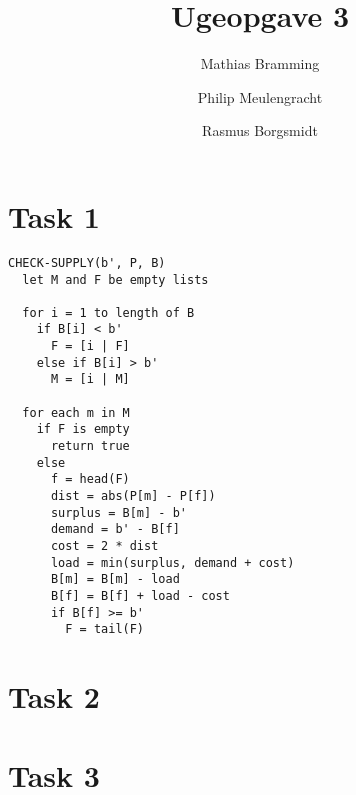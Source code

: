 \documentclass[paper=a4, fleqn]{article}
\title{Ugeopgave 3}
\author{Mathias Bramming \and Philip Meulengracht \and Rasmus Borgsmidt}
\date{}
\begin{document}
\maketitle
\section*{Task 1}

\begin{lstlisting}
CHECK-SUPPLY(b', P, B)
  let M and F be empty lists

  for i = 1 to length of B
    if B[i] < b'
      F = [i | F]
    else if B[i] > b'
      M = [i | M]

  for each m in M
    if F is empty
      return true
    else
      f = head(F)
      dist = abs(P[m] - P[f])
      surplus = B[m] - b'
      demand = b' - B[f]
      cost = 2 * dist
      load = min(surplus, demand + cost)
      B[m] = B[m] - load
      B[f] = B[f] + load - cost
      if B[f] >= b'
        F = tail(F)
\end{lstlisting}

\section*{Task 2}
\section*{Task 3}
\end{document}

